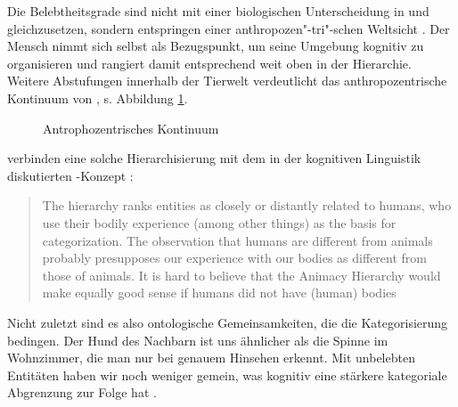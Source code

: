 Die Belebtheitsgrade sind nicht mit einer biologischen Unterscheidung in  und  gleichzusetzen, sondern entspringen einer anthropozen"-tri"-schen Weltsicht \parencite[s.][]{Fraurud1996,Yamamoto1999,Enger2011}. Der Mensch nimmt sich selbst als Bezugspunkt, um seine Umgebung kognitiv zu organisieren und rangiert damit entsprechend weit oben in der Hierarchie. Weitere Abstufungen innerhalb der Tierwelt verdeutlicht das anthropozentrische Kontinuum von \textcite[114--115]{Kopcke2000}, s. Abbildung \ref{anthro}. 

\begin{figure}
{\small{}}
\caption {Antrophozentrisches Kontinuum \parencite[115]{Kopcke2000}}
\label{anthro}
\end{figure} 

 \noindent
\textcite{Enger2011} verbinden eine solche Hierarchisierung mit dem in der kognitiven Linguistik diskutierten -Konzept \parencite[vgl.][]{Lakoff1999}:
\blockcquote[208]{Enger2011}[.]{The hierarchy ranks entities as
closely or distantly related to humans, who use their bodily experience (among other things) as the basis for categorization. The observation that humans are different from animals probably presupposes our experience with our bodies as different from those of animals. It is hard to believe that the Animacy Hierarchy would make equally good sense if humans did not have (human) bodies} Nicht zuletzt sind es also ontologische Gemeinsamkeiten, die die Kategorisierung bedingen. Der Hund des Nachbarn ist uns ähnlicher als die Spinne im Wohnzimmer, die man nur bei genauem Hinsehen erkennt.
Mit unbelebten Entitäten haben wir noch weniger gemein, was kognitiv eine stärkere kategoriale Abgrenzung zur Folge hat  \parencite[vgl. auch][16]{Yamamoto1999}.


